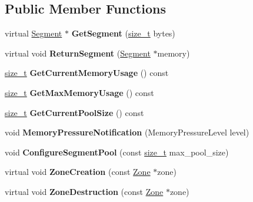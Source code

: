 \subsection*{Public Member Functions}
\begin{DoxyCompactItemize}
\item 
\mbox{\label{classv8_1_1internal_1_1AccountingAllocator_aa75c3e7e7ce82180b26ea4450ac2937d}} 
virtual \mbox{\hyperlink{classv8_1_1internal_1_1Segment}{Segment}} $\ast$ {\bfseries Get\+Segment} (\mbox{\hyperlink{classsize__t}{size\+\_\+t}} bytes)
\item 
\mbox{\label{classv8_1_1internal_1_1AccountingAllocator_a2a98c6a52bcda12c8a33b912f6630b96}} 
virtual void {\bfseries Return\+Segment} (\mbox{\hyperlink{classv8_1_1internal_1_1Segment}{Segment}} $\ast$memory)
\item 
\mbox{\label{classv8_1_1internal_1_1AccountingAllocator_aa81e107eb848411a28be8025d43bff4e}} 
\mbox{\hyperlink{classsize__t}{size\+\_\+t}} {\bfseries Get\+Current\+Memory\+Usage} () const
\item 
\mbox{\label{classv8_1_1internal_1_1AccountingAllocator_aba1b43e2bfd23806015c414450eaefd3}} 
\mbox{\hyperlink{classsize__t}{size\+\_\+t}} {\bfseries Get\+Max\+Memory\+Usage} () const
\item 
\mbox{\label{classv8_1_1internal_1_1AccountingAllocator_afcb53f6ec4f7bf36c79bc4a66591d45c}} 
\mbox{\hyperlink{classsize__t}{size\+\_\+t}} {\bfseries Get\+Current\+Pool\+Size} () const
\item 
\mbox{\label{classv8_1_1internal_1_1AccountingAllocator_a145522456193da0dbebf618d101571ed}} 
void {\bfseries Memory\+Pressure\+Notification} (Memory\+Pressure\+Level level)
\item 
\mbox{\label{classv8_1_1internal_1_1AccountingAllocator_a65fe549097fd29ec57b974cc4f36c3c3}} 
void {\bfseries Configure\+Segment\+Pool} (const \mbox{\hyperlink{classsize__t}{size\+\_\+t}} max\+\_\+pool\+\_\+size)
\item 
\mbox{\label{classv8_1_1internal_1_1AccountingAllocator_a08b927506f172711dffb0ab955444cc5}} 
virtual void {\bfseries Zone\+Creation} (const \mbox{\hyperlink{classv8_1_1internal_1_1Zone}{Zone}} $\ast$zone)
\item 
\mbox{\label{classv8_1_1internal_1_1AccountingAllocator_af830f8debf51a20b7215eb190b86b9ec}} 
virtual void {\bfseries Zone\+Destruction} (const \mbox{\hyperlink{classv8_1_1internal_1_1Zone}{Zone}} $\ast$zone)
\end{DoxyCompactItemize}
